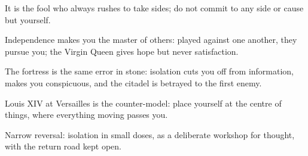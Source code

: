 

\begin{distilled}
  \item It is the fool who always rushes to take sides; do not commit to any side or cause but yourself.
  \item Independence makes you the master of others: played against one another, they pursue you; the Virgin Queen gives hope but never satisfaction.
  \item The fortress is the same error in stone: isolation cuts you off from information, makes you conspicuous, and the citadel is betrayed to the first enemy.
  \item Louis XIV at Versailles is the counter-model: place yourself at the centre of things, where everything moving passes you.
  \item Narrow reversal: isolation in small doses, as a deliberate workshop for thought, with the return road kept open.
\end{distilled}
